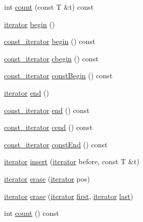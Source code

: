 \begin{DoxyCompactItemize}
\item 
int \hyperlink{class_q_list_a0d021cc6668a845a26097dc9d36e8c2f}{count} (const T \&t) const 
\item 
\hyperlink{class_q_list_1_1iterator}{iterator} \hyperlink{class_q_list_a06847e57431af245c937c8cfe1c14761}{begin} ()
\item 
\hyperlink{class_q_list_1_1const__iterator}{const\+\_\+iterator} \hyperlink{class_q_list_a9bbf2e9781ec8f486f35d680c100c8bd}{begin} () const 
\item 
\hyperlink{class_q_list_1_1const__iterator}{const\+\_\+iterator} \hyperlink{class_q_list_a3777e78981166825439ff10be6475152}{cbegin} () const 
\item 
\hyperlink{class_q_list_1_1const__iterator}{const\+\_\+iterator} \hyperlink{class_q_list_a8f6d53fe01e1c2aaea0a446580f99cdb}{const\+Begin} () const 
\item 
\hyperlink{class_q_list_1_1iterator}{iterator} \hyperlink{class_q_list_a5695ddeb676cedece5b061eba08c1d0c}{end} ()
\item 
\hyperlink{class_q_list_1_1const__iterator}{const\+\_\+iterator} \hyperlink{class_q_list_a132567f83a4c5f5a2a7073c3fe200c28}{end} () const 
\item 
\hyperlink{class_q_list_1_1const__iterator}{const\+\_\+iterator} \hyperlink{class_q_list_a37f3b118d722e64fb834121fa3858fc4}{cend} () const 
\item 
\hyperlink{class_q_list_1_1const__iterator}{const\+\_\+iterator} \hyperlink{class_q_list_a66e34d5df478dda9190b9b075317690d}{const\+End} () const 
\item 
\hyperlink{class_q_list_1_1iterator}{iterator} \hyperlink{class_q_list_ae8308037e361e7e9112987ed41beefb6}{insert} (\hyperlink{class_q_list_1_1iterator}{iterator} before, const T \&t)
\item 
\hyperlink{class_q_list_1_1iterator}{iterator} \hyperlink{class_q_list_abe1d81b038b41b873794dab10bbb4ffd}{erase} (\hyperlink{class_q_list_1_1iterator}{iterator} pos)
\item 
\hyperlink{class_q_list_1_1iterator}{iterator} \hyperlink{class_q_list_a6873182c98006cfc7d4bd4637f2122b1}{erase} (\hyperlink{class_q_list_1_1iterator}{iterator} \hyperlink{class_q_list_a0d91b8dcfdf240b85c2349f339021cfa}{first}, \hyperlink{class_q_list_1_1iterator}{iterator} \hyperlink{class_q_list_a0e12e5e4af39fe20f860fe88a4fbc258}{last})
\item 
int \hyperlink{class_q_list_a94d3d2a8770163005f619c4fc6715b58}{count} () const 
\item 

\end{DoxyCompactItemize}
